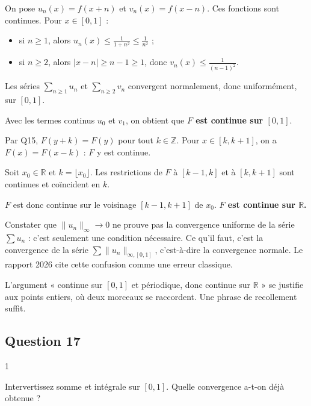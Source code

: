 \documentclass[11pt,a4paper]{article}
\providecommand{\tightlist}{\setlength{\itemsep}{0pt}\setlength{\parskip}{0pt}}
\begin{document}
On pose \(u_n(x)=f(x+n)\) et \(v_n(x)=f(x-n)\). Ces fonctions sont continues. Pour \(x\in[0,1]\) :

\begin{itemize}
\tightlist
\item
  si \(n\ge1\), alors \(u_n(x)\le\frac{1}{1+n^2}\le\frac{1}{n^2}\) ;
\item
  si \(n\ge2\), alors \(|x-n|\ge n-1\ge1\), donc \(v_n(x)\le\frac{1}{(n-1)^2}\).
\end{itemize}

Les séries \(\sum_{n\ge1}u_n\) et \(\sum_{n\ge2}v_n\) convergent normalement, donc uniformément, sur \([0,1]\).

Avec les termes continus \(u_0\) et \(v_1\), on obtient que \textbf{\(F\) est continue sur \([0,1]\)}.

Par Q15, \(F(y+k)=F(y)\) pour tout \(k\in\mathbb{Z}\). Pour \(x\in[k,k+1]\), on a \(F(x)=F(x-k)\) : \(F\) y est continue.

Soit \(x_0\in\mathbb{R}\) et \(k=\lfloor x_0\rfloor\). Les restrictions de \(F\) à \([k-1,k]\) et à \([k,k+1]\) sont continues et coïncident en \(k\).

\(F\) est donc continue sur le voisinage \([k-1,k+1]\) de \(x_0\). \textbf{\(F\) est continue sur \(\mathbb{R}\).}

\begin{piege}

Constater que \(\|u_n\|_\infty\to0\) ne prouve pas la convergence uniforme de la série \(\sum u_n\) : c'est seulement une condition nécessaire. Ce qu'il faut, c'est la convergence de la série \(\sum\|u_n\|_{\infty,[0,1]}\), c'est-à-dire la convergence normale. Le rapport 2026 cite cette confusion comme une erreur classique.

\end{piege}

\begin{methode}

L'argument « continue sur \([0,1]\) et périodique, donc continue sur \(\mathbb{R}\) » se justifie aux points entiers, où deux morceaux se raccordent. Une phrase de recollement suffit.

\end{methode}

\hypertarget{question-17}{%
\subsection{Question 17}\label{question-17}}

\begin{indication}{1}

Intervertissez somme et intégrale sur \([0,1]\). Quelle convergence a-t-on déjà obtenue ?

\end{indication}
\end{document}
